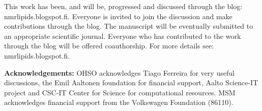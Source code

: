 \documentclass[pre,aps,floatfix,authordate1-4,twocolumn]{revtex4-1}
\begin{document}












This work has been, and will be, progressed and discussed through the blog: nmrlipids.blogspot.fi. 
Everyone is invited to join the discussion and make contributions through the blog. 
The manuscript will be eventually submitted to an appropriate scientific journal. 
Everyone who has contributed to the work through the blog will be offered 
coauthorship. For more details see: nmrlipids.blogspot.fi.   

{\bf Acknowledgements: }
OHSO acknowledges Tiago Ferreira for very useful discussions, the Emil Aaltonen foundation for financial support, Aalto Science-IT project and CSC-IT Center for Science for computational resources. 
%
MSM acknowledges financial support from the Volkswagen Foundation (86110).
\end{document}
